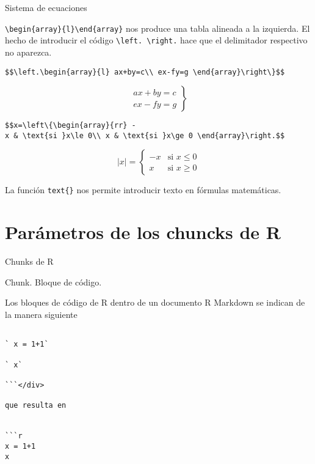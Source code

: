 \documentclass[
  ignorenonframetext,
]{beamer}
\begin{document}
\begin{frame}[fragile]{Sistema de ecuaciones}
\protect\hypertarget{sistema-de-ecuaciones}{}

\texttt{\textbackslash{}begin\{array\}\{l\}\textbackslash{}end\{array\}}
nos produce una tabla alineada a la izquierda. El hecho de introducir el
código \texttt{\textbackslash{}left.\ \textbackslash{}right.} hace que
el delimitador respectivo no aparezca.

\texttt{\$\$\textbackslash{}left.\textbackslash{}begin\{array\}\{l\}\ ax+by=c\textbackslash{}\textbackslash{}\ ex-fy=g\ \textbackslash{}end\{array\}\textbackslash{}right\textbackslash{}\}\$\$}

\[\left.\begin{array}{l}
ax+by=c\\
ex-fy=g
\end{array}\right\}\]

\texttt{\$\$\textbar{}x\textbar{}=\textbackslash{}left\textbackslash{}\{\textbackslash{}begin\{array\}\{rr\}\ -x\ \&\ \textbackslash{}text\{si\ \}x\textbackslash{}le\ 0\textbackslash{}\textbackslash{}\ x\ \&\ \textbackslash{}text\{si\ \}x\textbackslash{}ge\ 0\ \textbackslash{}end\{array\}\textbackslash{}right.\$\$}

\[|x|=\left\{\begin{array}{rr}
-x & \text{si }x\le 0\\
x & \text{si }x\ge 0
\end{array}\right.\]

La función \texttt{text\{\}} nos permite introducir texto en fórmulas
matemáticas.

\end{frame}

\hypertarget{paruxe1metros-de-los-chuncks-de-r}{%
\section{Parámetros de los chuncks de
R}\label{paruxe1metros-de-los-chuncks-de-r}}

\begin{frame}[fragile]{Chunks de R}
\protect\hypertarget{chunks-de-r}{}

Chunk. Bloque de código.

Los bloques de código de R dentro de un documento R Markdown se indican
de la manera siguiente

\begin{verbatim}

` x = 1+1`

` x`

```</div>

que resulta en


```r
x = 1+1
x
\end{verbatim}

\end{frame}
\end{document}
